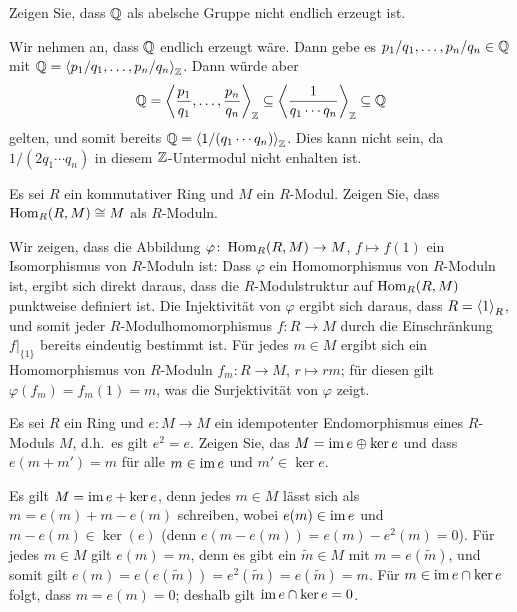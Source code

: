 \begin{question}
  \label{question: Q is not finitely generated}
  Zeigen Sie, dass $\mathbb{Q}$ als abelsche Gruppe nicht endlich erzeugt ist.
\end{question}


\begin{solution}
  Wir nehmen an, dass $\mathbb{Q}$ endlich erzeugt wäre.
  Dann gebe es $p_1/q_1, \dotsc, p_n/q_n \in \mathbb{Q}$ mit $\mathbb{Q} = \left\langle p_1/q_1, \dotsc, p_n/q_n \right\rangle_{\mathbb{Z}}$.
  Dann würde aber
  \[
              \mathbb{Q}
    =         \left\langle  \frac{p_1}{q_1}, \dotsc, \frac{p_n}{q_n}  \right\rangle_{\mathbb{Z}}
    \subseteq \left\langle \frac{1}{q_1 \dotsm q_n} \right\rangle_{\mathbb{Z}}
    \subseteq \mathbb{Q}
  \]
  gelten, und somit bereits $\mathbb{Q} = \left\langle 1/(q_1 \dotsm q_n) \right\rangle_{\mathbb{Z}}$.
  Dies kann nicht sein, da $1/(2 q_1 \dotsm q_n)$ in diesem $\mathbb{Z}$-Untermodul nicht enhalten ist.
\end{solution}


\begin{question}
  Es sei $R$ ein kommutativer Ring und $M$ ein $R$-Modul.
  Zeigen Sie, dass $\operatorname{Hom}_R(R, M) \cong M$ als $R$-Moduln.
\end{question}


\begin{solution}
  Wir zeigen, dass die Abbildung $\varphi \colon \operatorname{Hom}_R(R, M) \to M$, $f \mapsto f(1)$ ein Isomorphismus von $R$-Moduln ist:
  Dass $\varphi$ ein Homomorphismus von $R$-Moduln ist, ergibt sich direkt daraus, dass die $R$-Modulstruktur auf $\operatorname{Hom}_R(R, M)$ punktweise definiert ist.
  Die Injektivität von $\varphi$ ergibt sich daraus, dass $R = \left\langle 1 \right\rangle_R$, und somit jeder $R$-Modulhomomorphismus $f \colon R \to M$ durch die Einschränkung $f|_{\{1\}}$ bereits eindeutig bestimmt ist.
  Für jedes $m \in M$ ergibt sich ein Homomorphismus von $R$-Moduln $f_m \colon R \to M$, $r \mapsto rm$;
  für diesen gilt $\varphi(f_m) = f_m(1) = m$, was die Surjektivität von $\varphi$ zeigt.
\end{solution}


\begin{question}
  Es sei $R$ ein Ring und $e \colon M \to M$ ein idempotenter Endomorphismus eines $R$-Moduls $M$, d.h.\ es gilt $e^2 = e$.
  Zeigen Sie, das $M = \operatorname{im} e \oplus \ker e$ und dass $e(m + m') = m$ für alle $m \in \operatorname{im} e$ und $m' \in \ker e$.
\end{question}


\begin{solution}
  Es gilt $M = \operatorname{im} e + \ker e$, denn jedes $m \in M$ lässt sich als $m = e(m) + m - e(m)$ schreiben, wobei $e(m) \in \operatorname{im} e$ und $m - e(m) \in \ker(e)$ (denn $e(m - e(m)) = e(m) - e^2(m) = 0$).
  Für jedes $m \in M$ gilt $e(m) = m$, denn es gibt ein $\tilde{m} \in M$ mit $m = e(\tilde{m})$, und somit gilt $e(m) = e(e(\tilde{m})) = e^2(\tilde{m}) = e(\tilde{m}) = m$.
  Für $m \in \operatorname{im} e \cap \ker e$ folgt, dass $m = e(m) = 0$;
  deshalb gilt $\operatorname{im} e \cap \ker e = 0$.
\end{solution}


